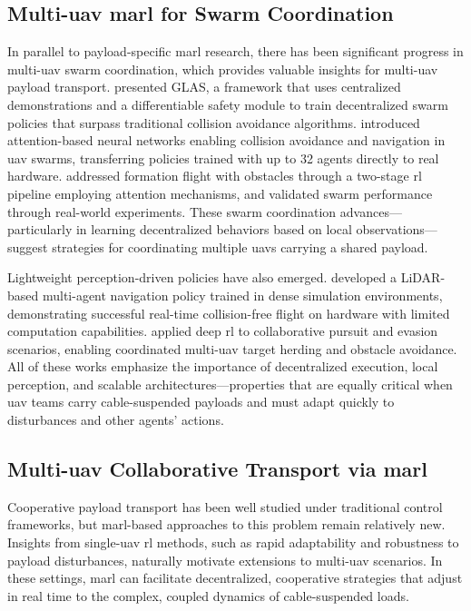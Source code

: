 \subsection{Multi-\gls{uav} \gls{marl} for Swarm Coordination}
In parallel to payload-specific \gls{marl} research, there has been significant progress in multi-\gls{uav} swarm coordination, which provides valuable insights for multi-\gls{uav} payload transport. \cite{riviere_glas_2020} presented GLAS, a framework that uses centralized demonstrations and a differentiable safety module to train decentralized swarm policies that surpass traditional collision avoidance algorithms. \cite{huang_collision_2024} introduced attention-based neural networks enabling collision avoidance and navigation in \gls{uav} swarms, transferring policies trained with up to 32 agents directly to real hardware. \cite{xie_multi-uav_2024} addressed formation flight with obstacles through a two-stage \gls{rl} pipeline employing attention mechanisms, and validated swarm performance through real-world experiments. These swarm coordination advances—particularly in learning decentralized behaviors based on local observations—suggest strategies for coordinating multiple \gls{uav}s carrying a shared payload.

Lightweight perception-driven policies have also emerged. \cite{diao_efficient_2024} developed a LiDAR-based multi-agent navigation policy trained in dense simulation environments, demonstrating successful real-time collision-free flight on hardware with limited computation capabilities. \cite{zhao_deep_2024} applied deep \gls{rl} to collaborative pursuit and evasion scenarios, enabling coordinated multi-\gls{uav} target herding and obstacle avoidance. All of these works emphasize the importance of decentralized execution, local perception, and scalable architectures—properties that are equally critical when \gls{uav} teams carry cable-suspended payloads and must adapt quickly to disturbances and other agents' actions.

\subsection{Multi-\gls{uav} Collaborative Transport via \gls{marl}}
Cooperative payload transport has been well studied under traditional control frameworks, but \gls{marl}-based approaches to this problem remain relatively new. Insights from single-\gls{uav} \gls{rl} methods, such as rapid adaptability and robustness to payload disturbances, naturally motivate extensions to multi-\gls{uav} scenarios. In these settings, \gls{marl} can facilitate decentralized, cooperative strategies that adjust in real time to the complex, coupled dynamics of cable-suspended loads.

